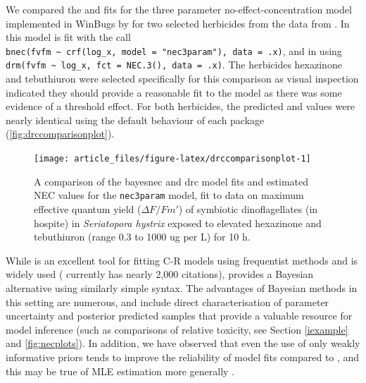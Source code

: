 \documentclass[
  shortnames]{jss}
\begin{document}
We compared the  and  fits for the three parameter no-effect-concentration model implemented in WinBugs by \citet{Fox2010} for two selected herbicides from the data from \citet{jones2003meps}. In  this model is fit with the call \texttt{bnec(fvfm\ \textasciitilde{}\ crf(log\_x,\ model\ =\ "nec3param"),\ data\ =\ .x)}, and in  using \texttt{drm(fvfm\ \textasciitilde{}\ log\_x,\ fct\ =\ NEC.3(),\ data\ =\ .x)}. The herbicides hexazinone and tebuthiuron were selected specifically for this comparison as visual inspection indicated they should provide a reasonable fit to the \citep{Fox2010} model as there was some evidence of a threshold effect. For both herbicides, the predicted  and  values were nearly identical using the default behaviour of each package (\autoref{fig:drccomparisonplot}).

\begin{CodeChunk}
\begin{figure}[!ht]

{\centering \texttt{[image: article\_files/figure-latex/drccomparisonplot-1]} 

}

\caption[A comparison of the bayesnec and drc model fits and estimated NEC values for the \texttt{nec3param} model, fit to data on maximum effective quantum yield ($\Delta F / Fm'$) of symbiotic dinoflagellates (in hospite) in \textit{Seriatopora hystrix} exposed to elevated hexazinone and tebuthiuron (range 0.3 to 1000 ug per L) for 10 h]{A comparison of the bayesnec and drc model fits and estimated NEC values for the \texttt{nec3param} model, fit to data on maximum effective quantum yield ($\Delta F / Fm'$) of symbiotic dinoflagellates (in hospite) in \textit{Seriatopora hystrix} exposed to elevated hexazinone and tebuthiuron (range 0.3 to 1000 ug per L) for 10 h.}\label{fig:drccomparisonplot}
\end{figure}
\end{CodeChunk}

While  is an excellent tool for fitting C-R models using frequentist methods and is widely used (\citet{Ritz2016} currently has nearly 2,000 citations),  provides a Bayesian alternative using similarly simple syntax. The advantages of Bayesian methods in this setting are numerous, and include direct characterisation of parameter uncertainty and posterior predicted samples that provide a valuable resource for model inference (such as comparisons of relative toxicity, see Section \ref{iexample} and \autoref{fig:necplots}). In addition, we have observed that even the use of only weakly informative priors tends to improve the reliability of model fits compared to , and this may be true of MLE estimation more generally \citep{krull2020comparing}.
\end{document}
